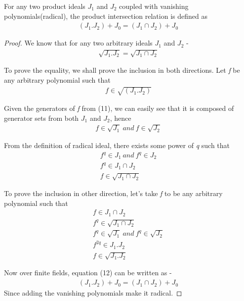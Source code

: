\documentclass{article}
\newcommand{\Jo}{J_1}
\newcommand{\Jz}{J_0}
\newcommand{\Jt}{J_2}
\begin{document}
For any two product ideals $\Jo$ and $\Jt$ coupled with vanishing polynomials(radical), the product intersection relation is defined as
\begin{align*}
 (\Jo.\Jt)+\Jz = (\Jo \cap \Jt) + \Jz
\end{align*}
\begin{proof}

We know that for any two arbitrary ideals $\Jo$ and $\Jt$ -
\begin{align}
\sqrt{\Jo.\Jt} = \sqrt{\Jo\cap \Jt}
\end{align}

To prove the equality, we shall prove the inclusion in both directions. Let \textit{f} be any arbitrary polynomial such that
\begin{align*}
f \in \sqrt{(\Jo.\Jt)}
\end{align*}

Given the generators of \textit{f} from (11), we can easily see that it is composed of generator sets from both $\Jo$ and $\Jt$, hence
\begin{align*}
f \in \sqrt{\Jo}\ and \ f \in \sqrt{\Jt}
\end{align*}

From the definition of radical ideal, there exists some power of \textit{q} such that
\begin{align*}
f^q \in \Jo\ and \ f^q \in \Jt\\
f^q \in \Jo \cap \Jt\\
f \in \sqrt{\Jo \cap \Jt}
\end{align*}

To prove the inclusion in other direction, let's take \textit{f} to be any arbitrary polynomial such that
\begin{align*}
f \in \Jo \cap \Jt\\
f^q \in \sqrt{\Jo\cap\Jt}\\
f^q \in \sqrt{\Jo}\  and \ f^q \in \sqrt{\Jt}\\
f^{2q} \in \Jo .\Jt\\
f \in \sqrt{\Jo .\Jt}
\end{align*}

Now over finite fields, equation (12) can be written as - 
\begin{align}
 (\Jo.\Jt)+\Jz = (\Jo \cap \Jt) + \Jz
\end{align}
Since adding the vanishing polynomials make it radical.

\end{proof}


\end{document}
